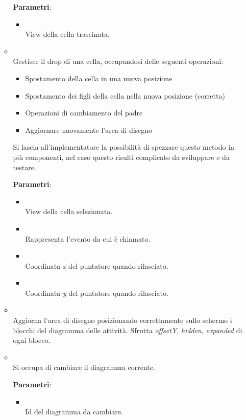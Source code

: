 \begin{itemize}
\begin{itemize}
\textbf{Parametri}:
\begin{itemize}
\item {}
\\ View della cella trascinata.

\end{itemize}
\item {}
\\ Gestisce il drop di una cella, occupandosi delle seguenti operazioni: \begin{itemize} \item Spostamento della cella in una nuova posizione \item Spostamento dei figli della cella nella nuova posizione (corretta) \item Operazioni di cambiamento del padre \item Aggiornare nuovamente l'area di disegno \end{itemize} Si lascia all'implementatore la possibilità di spezzare questo metodo in più componenti, nel caso questo risulti complicato da sviluppare e da testare.	

\textbf{Parametri}:
\begin{itemize}
\item {}
\\ View della cella selezionata.
\item {}
\\ Rappresenta l'evento da cui è chiamato.
\item {}
\\ Coordinata \emph{x} del puntatore quando rilasciato.
\item {}
\\ Coordinata \emph{y} del puntatore quando rilasciato.
\end{itemize}
\item {}
\\ Aggiorna l'area di disegno posizionando correttamente sullo schermo i blocchi del diagramma delle attività. Sfrutta \emph{offsetY}, \emph{hidden}, \emph{expanded} di ogni blocco.	

\item {}
\\ Si occupa di cambiare il diagramma corrente.	

\textbf{Parametri}:
\begin{itemize}
\item {}
\\ Id del diagramma da cambiare.
\end{itemize}
\end{itemize}
\end{itemize}
